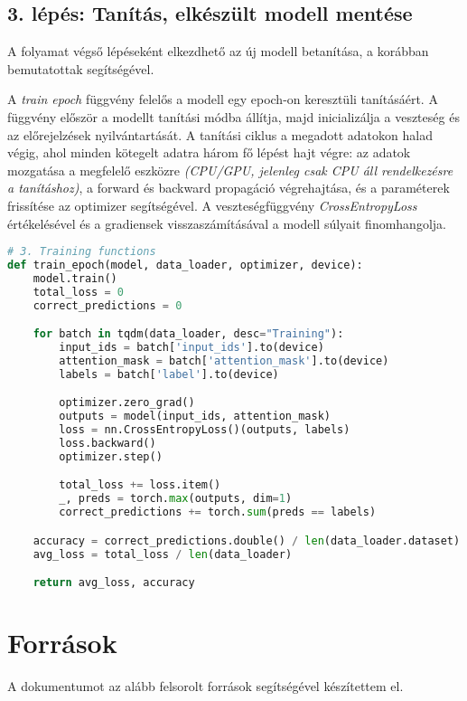 \documentclass[12pt]{article}
\begin{document}
\subsection{3. lépés: Tanítás, elkészült modell mentése}

A folyamat végső lépéseként elkezdhető az új modell betanítása, a korábban bemutatottak segítségével.

A \textit{train epoch} függvény felelős a modell egy epoch-on keresztüli tanításáért. A függvény először a modellt tanítási módba állítja, majd inicializálja a veszteség és az előrejelzések nyilvántartását. A tanítási ciklus a megadott adatokon halad végig, ahol minden kötegelt adatra három fő lépést hajt végre: az adatok mozgatása a megfelelő eszközre \textit{(CPU/GPU, jelenleg csak CPU áll rendelkezésre a tanításhoz)}, a forward és backward propagáció végrehajtása, és a paraméterek frissítése az optimizer segítségével. A veszteségfüggvény \textit{CrossEntropyLoss} értékelésével és a gradiensek visszaszámításával a modell súlyait finomhangolja.

\begin{lstlisting}[language=Python,caption=Tanítási folyamat]
# 3. Training functions
def train_epoch(model, data_loader, optimizer, device):
    model.train()
    total_loss = 0
    correct_predictions = 0

    for batch in tqdm(data_loader, desc="Training"):
        input_ids = batch['input_ids'].to(device)
        attention_mask = batch['attention_mask'].to(device)
        labels = batch['label'].to(device)

        optimizer.zero_grad()
        outputs = model(input_ids, attention_mask)
        loss = nn.CrossEntropyLoss()(outputs, labels)
        loss.backward()
        optimizer.step()

        total_loss += loss.item()
        _, preds = torch.max(outputs, dim=1)
        correct_predictions += torch.sum(preds == labels)

    accuracy = correct_predictions.double() / len(data_loader.dataset)
    avg_loss = total_loss / len(data_loader)

    return avg_loss, accuracy
\end{lstlisting}

\section{Források}
A dokumentumot az alább felsorolt források segítségével készítettem el.
\end{document}
